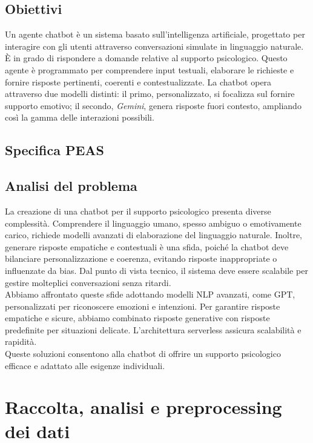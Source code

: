 \documentclass[12pt, letterpaper]{article}
\begin{document}
\subsection{Obiettivi}
Un agente chatbot è un sistema basato sull'intelligenza artificiale, progettato per interagire con gli utenti attraverso conversazioni simulate in linguaggio naturale. È in grado di rispondere a domande relative al supporto psicologico. Questo agente è programmato per comprendere input testuali, elaborare le richieste e fornire risposte pertinenti, coerenti e contestualizzate.
La chatbot opera attraverso due modelli distinti: il primo, personalizzato, si focalizza sul fornire supporto emotivo; il secondo, \textit{Gemini}, genera risposte fuori contesto, ampliando così la gamma delle interazioni possibili.

\subsection{Specifica PEAS}
\subsection{Analisi del problema}
La creazione di una chatbot per il supporto psicologico presenta diverse complessità. Comprendere il linguaggio umano, spesso ambiguo o emotivamente carico, richiede modelli avanzati di elaborazione del linguaggio naturale. Inoltre, generare risposte empatiche e contestuali è una sfida, poiché la chatbot deve bilanciare personalizzazione e coerenza, evitando risposte inappropriate o influenzate da bias. Dal punto di vista tecnico, il sistema deve essere scalabile per gestire molteplici conversazioni senza ritardi. \\
Abbiamo affrontato queste sfide adottando modelli NLP avanzati, come GPT, personalizzati per riconoscere emozioni e intenzioni. Per garantire risposte empatiche e sicure, abbiamo combinato risposte generative con risposte predefinite per situazioni delicate. L’architettura serverless assicura scalabilità e rapidità.\\ Queste soluzioni consentono alla chatbot di offrire un supporto psicologico efficace e adattato alle esigenze individuali.

\section{Raccolta, analisi e preprocessing dei dati}
\end{document}
